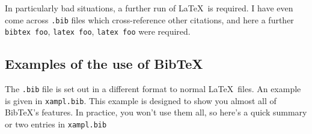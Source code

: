 \documentclass[a4paper]{article}
\newcommand{\fn}[1]{{\tt #1}}
\newcommand{\BibTeX}{{\sc Bib}\TeX}
\begin{document}
In particularly bad situations, 
a further run of \LaTeX\ is required.
I have even come across \fn{.bib} files which cross-reference other
citations, and here a further {\tt bibtex foo}, {\tt latex foo},
{\tt latex foo} were required.

\subsection{Examples of the use of \BibTeX}

The \fn{.bib} file is set out in a different format to normal
\LaTeX\ files.  An example is given in \fn{xampl.bib}.  This example
is designed to show you almost all of \BibTeX's features.  
In practice,
you won't use them all, so here's a quick summary or two entries
in \fn{xampl.bib}
\end{document}
